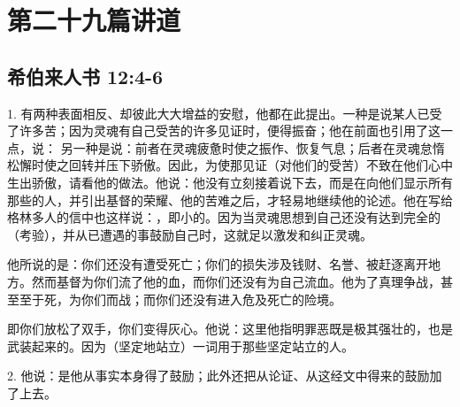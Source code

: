 
\section{第二十九篇讲道}


\subsection{希伯来人书 12:4-6}

\par

1. 有两种表面相反、却彼此大大增益的安慰，他都在此提出。一种是说某人已受了许多苦；因为灵魂有自己受苦的许多见证时，便得振奋；他在前面也引用了这一点，说： 另一种是说：前者在灵魂疲惫时使之振作、恢复气息；后者在灵魂怠惰松懈时使之回转并压下骄傲。因此，为使那见证（对他们的受苦）不致在他们心中生出骄傲，请看他的做法。他说：他没有立刻接着说下去，而是在向他们显示所有那些的人，并引出基督的荣耀、他的苦难之后，才轻易地继续他的论述。他在写给格林多人的信中也这样说：，即小的。因为当灵魂思想到自己还没有达到完全的（考验），并从已遭遇的事鼓励自己时，这就足以激发和纠正灵魂。\par

他所说的是：你们还没有遭受死亡；你们的损失涉及钱财、名誉、被赶逐离开地方。然而基督为你们流了他的血，而你们还没有为自己流血。他为了真理争战，甚至至于死，为你们而战；而你们还没有进入危及死亡的险境。\par

即你们放松了双手，你们变得灰心。他说：这里他指明罪恶既是极其强壮的，也是武装起来的。因为（坚定地站立）一词用于那些坚定站立的人。\par

2. 他说：是他从事实本身得了鼓励；此外还把从论证、从这经文中得来的鼓励加了上去。\par

